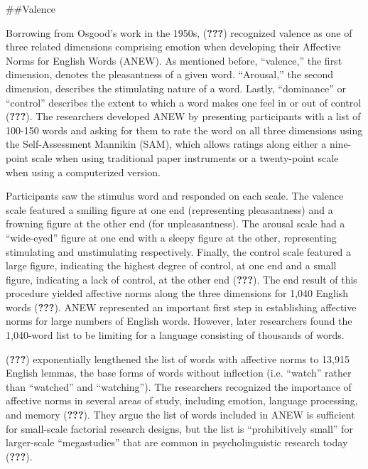 \documentclass[,man]{apa6}
\theoremstyle{definition}
\theoremstyle{definition}
\theoremstyle{definition}
\theoremstyle{remark}
\begin{document}
\#\#Valence

Borrowing from Osgood's work in the 1950s, ({\textbf{???}}) recognized
valence as one of three related dimensions comprising emotion when
developing their Affective Norms for English Words (ANEW). As mentioned
before, \enquote{valence,} the first dimension, denotes the pleasantness
of a given word. \enquote{Arousal,} the second dimension, describes the
stimulating nature of a word. Lastly, \enquote{dominance} or
\enquote{control} describes the extent to which a word makes one feel in
or out of control ({\textbf{???}}). The researchers developed ANEW by
presenting participants with a list of 100-150 words and asking for them
to rate the word on all three dimensions using the Self-Assessment
Mannikin (SAM), which allows ratings along either a nine-point scale
when using traditional paper instruments or a twenty-point scale when
using a computerized version.

Participants saw the stimulus word and responded on each scale. The
valence scale featured a smiling figure at one end (representing
pleasantness) and a frowning figure at the other end (for
unpleasantness). The arousal scale had a \enquote{wide-eyed} figure at
one end with a sleepy figure at the other, representing stimulating and
unstimulating respectively. Finally, the control scale featured a large
figure, indicating the highest degree of control, at one end and a small
figure, indicating a lack of control, at the other end ({\textbf{???}}).
The end result of this procedure yielded affective norms along the three
dimensions for 1,040 English words ({\textbf{???}}). ANEW represented an
important first step in establishing affective norms for large numbers
of English words. However, later researchers found the 1,040-word list
to be limiting for a language consisting of thousands of words.

({\textbf{???}}) exponentially lengthened the list of words with
affective norms to 13,915 English lemmas, the base forms of words
without inflection (i.e. \enquote{watch} rather than \enquote{watched}
and \enquote{watching}). The researchers recognized the importance of
affective norms in several areas of study, including emotion, language
processing, and memory ({\textbf{???}}). They argue the list of words
included in ANEW is sufficient for small-scale factorial research
designs, but the list is \enquote{prohibitively small} for larger-scale
\enquote{megastudies} that are common in psycholinguistic research today
({\textbf{???}}).
\end{document}

